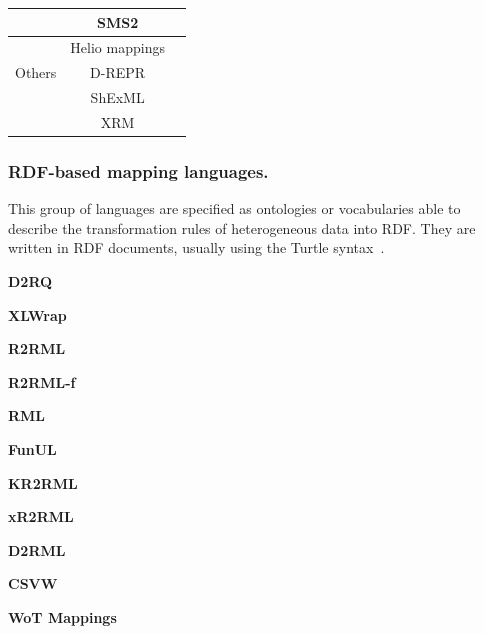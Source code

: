 \begin{table}[t]
\begin{tabular}{c|c|c}
                              & SMS2            & \citep{sms2}\\ \hline
\multirow{3}{*}{Others}       & Helio mappings  & \citep{cimmino2022helio}\\ \cline{2-3} 
                              & D-REPR          & \citep{Vu2019d-repr}\\ \cline{2-3} 
                              & ShExML          & \citep{Garcia-Gonzalez2020shexml,shexml}\\ \cline{2-3}
                              & XRM             & \citep{xrm}\\ \hline
\end{tabular}
\end{table}

\subsubsection{RDF-based mapping languages.} 

This group of languages are specified as ontologies or vocabularies able to describe the transformation rules of heterogeneous data into RDF. They are written in RDF documents, usually using the Turtle syntax~\citep{turtle}. 



\noindent\textbf{D2RQ}~\citep{bizer2004d2rq}

\noindent\textbf{XLWrap}~\citep{langegger2009xlwrap}

\noindent\textbf{R2RML}~\citep{das2012r2rml}

\noindent\textbf{R2RML-f}~\citep{debruyne2016r2rmlf}

\noindent\textbf{RML}~\citep{Dimou2014rml}

\noindent\textbf{FunUL}~\citep{junior2016funul}

\noindent\textbf{KR2RML}~\citep{slepicka2015kr2rml}

\noindent\textbf{xR2RML}~\citep{michel2015xr2rml}

\noindent\textbf{D2RML}~\citep{chortaras2018d2rml}

\noindent\textbf{CSVW}~\citep{Tennison2015csvw}

\noindent\textbf{WoT Mappings}~\citep{cimmino2020ewot}


